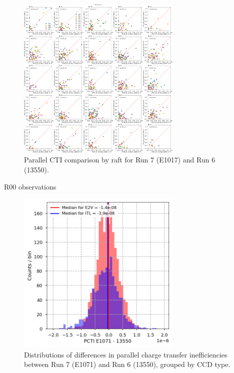 \begin{figure}[ht]
\begin{centering}
\includegraphics[width=0.7\textwidth]{figures/baselineCharacterization/13550_E1071_PCTI_EF_43_inset.png}
\caption{Parallel CTI comparison by raft for Run 7 (E1017) and Run 6 (13550).}
\label{fig:parallel-cti}
\end{centering}
\end{figure}

R00 observations

\begin{figure}[ht]
\begin{centering}
\includegraphics[width=0.7\textwidth]{figures/baselineCharacterization/PCTI_13550_E1071_diff.png}
\caption{Distributions of differences in parallel charge transfer inefficiencies between Run 7 (E1071) and Run 6 (13550), grouped by CCD type.}
\label{fig:parallel-cti-dist}
\end{centering}
\end{figure}

